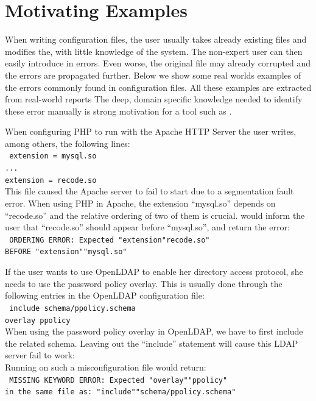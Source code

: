 \section{Motivating Examples}
\label{sec:motiv}

When writing configuration files, the user usually takes already existing files and modifies the, with little knowledge of the system. 
The non-expert user can then easily introduce in errors.
Even worse, the original file may already corrupted and the errors are propagated further. 
Below we show some real worlds examples of the errors commonly found in configuration files.
All these examples are extracted from real-world reports %
The deep, domain specific knowledge needed to identify these error manually is strong motivation for a tool such as \app.

 When configuring PHP to run with the Apache HTTP Server the user writes, among others, the following lines:\\
 \texttt{
 \hspace*{3em}extension = mysql.so\\
 \hspace*{3em}...\\
 \hspace*{3em}extension = recode.so}\\
This file caused the Apache server to fail to start due to a segmentation fault error.
When using PHP in Apache, the extension ``mysql.so'' depends on ``recode.so'' and the relative ordering of two of them is crucial. 
\app would inform the user that ``recode.so'' should appear before ``mysql.so'', and return the error:\\
 \texttt{
ORDERING ERROR: Expected "extension"recode.so"\\
   BEFORE "extension""mysql.so"
  }

 If the user wants to use OpenLDAP to enable her directory access
protocol, she needs to use the password policy overlay. This is usually
done through the following entries in the OpenLDAP configuration file:\\
\texttt{
 \hspace*{3em}include schema/ppolicy.schema\\
 \hspace*{3em}overlay ppolicy\\}
When using the password policy overlay in OpenLDAP, we have to first include the related schema.
Leaving out the ``include'' statement will cause this LDAP server fail to work:\\
Running \app on such a misconfiguration file would return:\\
\texttt{
MISSING KEYWORD ERROR: Expected "overlay""ppolicy"\\ 
in the same file as: "include""schema/ppolicy.schema"}

